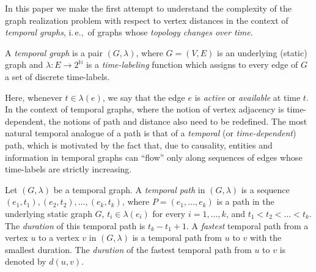 \documentclass[a4paper,UKenglish,cleveref, autoref, thm-restate]{lipics-v2021}
\newcommand{\ie}{i.\,e.,\ }
\begin{document}
In this paper we make the first attempt to understand the complexity of the graph realization problem with respect to vertex distances in the context of \emph{temporal graphs}, \ie of graphs whose \emph{topology changes over time}. 

\begin{definition}
\label{temp-graph-def} A \emph{temporal graph} is a pair $(G,\lambda)$,
where $G=(V,E)$ is an underlying (static) graph and $\lambda :E\rightarrow 2^\mathbb{N}$ is a \emph{time-labeling} function which assigns to every edge of $G$ a set of discrete time-labels.
\end{definition}

Here, whenever $t \in \lambda(e)$, we say that the edge $e$ is \emph{active} or \emph{available} at time $t$. In the context of temporal graphs, where the notion of vertex adjacency is time-dependent, the notions of path and distance also need to be redefined. The most natural temporal analogue of a path is that of a \emph{temporal} (or \emph{time-dependent}) path, which is motivated by the fact that, due to
causality, entities and information in temporal graphs can ``flow'' only along sequences of
edges whose time-labels are strictly increasing.

\begin{definition} \label{def:temporalPath+Duration}
Let $(G,\lambda)$ be a temporal graph. A \emph{temporal path} 
in $(G,\lambda)$ is a sequence $(e_1,t_1),(e_2,t_2),\ldots,(e_k,t_k)$, 
where $P=(e_1,\ldots,e_k)$ is a path in the underlying static graph $G$, 
$t_i\in \lambda(e_i)$ for every $i=1,\ldots,k$, and $t_1<t_2<\ldots<t_k$. 
The \emph{duration} of this temporal path %
is $t_k - t_1 + 1$.
A \emph{fastest} temporal path from a vertex $u$ to a vertex $v$ in $(G,\lambda)$ is a temporal path from $u$ to $v$ with the smallest duration.
The \emph{duration} of the fastest temporal path from $u$ to $v$ is denoted by $d(u,v)$.
\end{definition}

\end{document}
